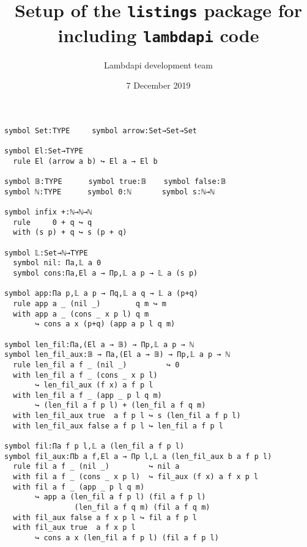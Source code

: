 \documentclass{article}
\title{Setup of the {\tt listings} package for including {\tt lambdapi} code}
\author{Lambdapi development team}
\date{7 December 2019}
\begin{document}
\maketitle

\small
\begin{lstlisting}
symbol Set:TYPE     symbol arrow:Set→Set→Set

symbol El:Set→TYPE
  rule El (arrow a b) ↪ El a → El b

symbol 𝔹:TYPE      symbol true:𝔹    symbol false:𝔹
symbol ℕ:TYPE      symbol 0:ℕ       symbol s:ℕ→ℕ

symbol infix +:ℕ→ℕ→ℕ
  rule     0 + q ↪ q
  with (s p) + q ↪ s (p + q)

symbol 𝕃:Set→ℕ→TYPE
  symbol nil: Πa,𝕃 a 0
  symbol cons:Πa,El a → Πp,𝕃 a p → 𝕃 a (s p)

symbol app:Πa p,𝕃 a p → Πq,𝕃 a q → 𝕃 a (p+q)
  rule app a _ (nil _)        q m ↪ m
  with app a _ (cons _ x p l) q m
       ↪ cons a x (p+q) (app a p l q m)

symbol len_fil:Πa,(El a → 𝔹) → Πp,𝕃 a p → ℕ
symbol len_fil_aux:𝔹 → Πa,(El a → 𝔹) → Πp,𝕃 a p → ℕ
  rule len_fil a f _ (nil _)         ↪ 0
  with len_fil a f _ (cons _ x p l)
       ↪ len_fil_aux (f x) a f p l
  with len_fil a f _ (app _ p l q m)
       ↪ (len_fil a f p l) + (len_fil a f q m)
  with len_fil_aux true  a f p l ↪ s (len_fil a f p l)
  with len_fil_aux false a f p l ↪ len_fil a f p l

symbol fil:Πa f p l,𝕃 a (len_fil a f p l)
symbol fil_aux:Πb a f,El a → Πp l,𝕃 a (len_fil_aux b a f p l)
  rule fil a f _ (nil _)         ↪ nil a
  with fil a f _ (cons _ x p l)  ↪ fil_aux (f x) a f x p l
  with fil a f _ (app _ p l q m)
       ↪ app a (len_fil a f p l) (fil a f p l)
                (len_fil a f q m) (fil a f q m)
  with fil_aux false a f x p l ↪ fil a f p l
  with fil_aux true  a f x p l
       ↪ cons a x (len_fil a f p l) (fil a f p l)
\end{lstlisting}
\end{document}
